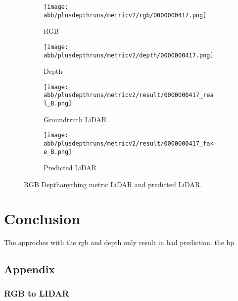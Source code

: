 \begin{figure}[!ht]
	\centering
	
	\begin{subfigure}{0.4\textwidth}
		\centering
		\texttt{[image: abb/plusdepthruns/metricv2/rgb/0000000417.png]}
		\caption{RGB}
		\label{fig:bild1}
	\end{subfigure}
	
	\vspace{1em} %
	
	\begin{subfigure}{0.4\textwidth}
		\centering
		\texttt{[image: abb/plusdepthruns/metricv2/depth/0000000417.png]}
		\caption{Depth}
		\label{fig:bild2}
	\end{subfigure}
	
	\vspace{1em} %
	
	\begin{subfigure}{0.25\textwidth}
		\centering
		\texttt{[image: abb/plusdepthruns/metricv2/result/0000000417\_real\_B.png]}
		\caption{Groundtruth LiDAR}
		\label{fig:bild3}
	\end{subfigure}
	\begin{subfigure}{0.25\textwidth}
		\centering
		\texttt{[image: abb/plusdepthruns/metricv2/result/0000000417\_fake\_B.png]}
		\caption{Predicted LiDAR}
		\label{fig:bild4}
	\end{subfigure}
	
	\caption{RGB Depthanything metric LiDAR and predicted LiDAR.}
	\label{metric_rgbd}
\end{figure}
\chapter{Conclusion}
The approches with the rgb and depth only result in bad prediction. the bp 

\section{Appendix}
\subsection{RGB to LIDAR}

